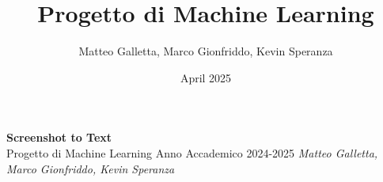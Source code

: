 \documentclass[12pt,a4paper,openany,oneside]{book}
\title{Progetto di Machine Learning}
\author{Matteo Galletta, Marco Gionfriddo, Kevin Speranza}
\date{April 2025}
\begin{document}
\begin{titlepage}
    \centering
    \vspace*{3cm}
    {\Huge \textbf{Screenshot to Text}}\\[1.5cm]
    {\Large Progetto di Machine Learning}
    {\Large Anno Accademico 2024-2025}
    \vfill
    \normalsize{\textit{Matteo Galletta, Marco Gionfriddo, Kevin Speranza}}
\end{titlepage}
\tableofcontents
\newpage
{}









\end{document}
